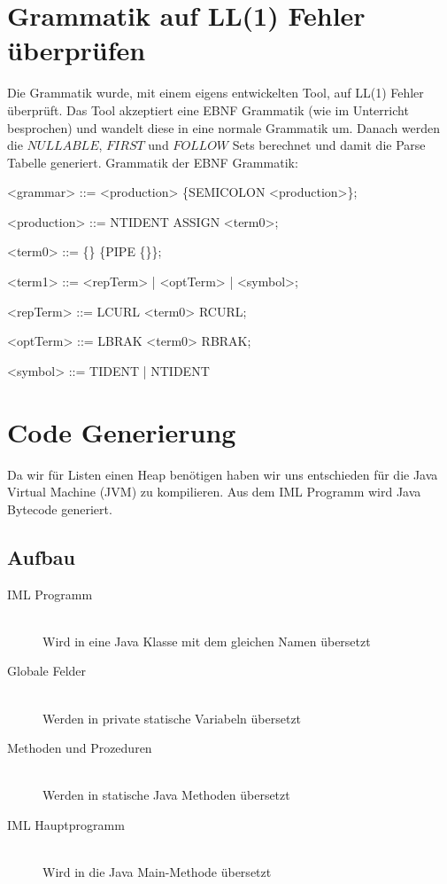 \documentclass[a4paper,notitlepage,oneside]{article}
\begin{document}
\section{Grammatik auf LL(1) Fehler überprüfen}
Die Grammatik wurde, mit einem eigens entwickelten Tool, auf LL(1) Fehler überprüft. Das Tool akzeptiert eine EBNF Grammatik (wie im Unterricht besprochen) und wandelt diese in eine normale Grammatik um. Danach werden die $NULLABLE$, $FIRST$ und $FOLLOW$ Sets berechnet und damit die Parse Tabelle generiert.
\newline
\newline
Grammatik der EBNF Grammatik:
\begin{grammar}
<grammar> ::= <production> \{SEMICOLON <production>\};

<production> ::= NTIDENT ASSIGN <term0>;

<term0> ::= \{<term1>\} \{PIPE \{<term1>\}\};

<term1> ::= <repTerm> | <optTerm> | <symbol>;

<repTerm> ::= LCURL <term0> RCURL;

<optTerm> ::= LBRAK <term0> RBRAK;

<symbol> ::= TIDENT | NTIDENT
\end{grammar}

\section{Code Generierung}
Da wir für Listen einen Heap benötigen haben wir uns entschieden für die Java Virtual Machine (JVM) zu kompilieren. Aus dem IML Programm wird Java Bytecode generiert.

\subsection{Aufbau}
\begin{description}
	\item[IML Programm] \hfill \\
	Wird in eine Java Klasse mit dem gleichen Namen 		übersetzt
	\item[Globale Felder] \hfill \\
	Werden in private statische Variabeln übersetzt
	\item[Methoden und Prozeduren] \hfill \\
	Werden in statische Java Methoden übersetzt
	\item[IML Hauptprogramm] \hfill \\
	Wird in die Java Main-Methode übersetzt
\end{description}
\end{document}
